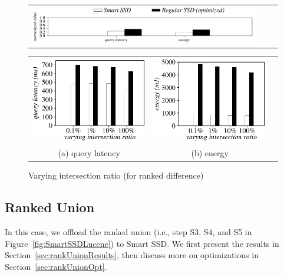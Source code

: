  \begin{figure}[tbp]
\centering
\begin{tabular}{ccc}
\includegraphics[width=0.52\columnwidth]{figures/banner2.pdf}
\end{tabular}
\vspace{-0.1cm}
\renewcommand{\tabcolsep}{0.1mm}
\begin{tabular}{ccc}
\includegraphics[width=0.5\columnwidth]{figures/RankDifference-time-VaryInterRatio-equal.eps}&
\includegraphics[width=0.5\columnwidth]{figures/RankDifference-energy-VaryInterRatio-equal.eps}\\
(a) query latency & (b) energy
\end{tabular}
\caption{Varying intersection ratio (for ranked difference)}
\label{fig:varyInterRatioRankDifference}
\end{figure}


\subsection{Ranked Union}\label{sec:expRankedUnion}
In this case, we offload the \textsf{ranked union} (i.e., step S3, S4, and S5 in Figure~\ref{fig:SmartSSDLucene}) to Smart SSD. We first present the results in Section~\ref{sec:rankUnionResults}, then discuss more on optimizations in Section~\ref{sec:rankUnionOpt}.

